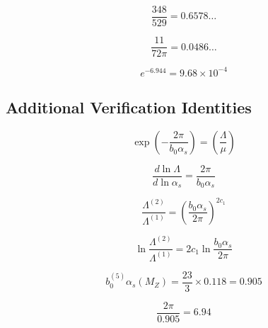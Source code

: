 \documentclass[11pt,a4paper]{article}
\theoremstyle{definition}
\begin{document}
\begin{equation}
\label{eq:cat-58}
\frac{348}{529} = 0.6578\ldots
\end{equation}

\begin{equation}
\label{eq:cat-59}
\frac{11}{72\pi} = 0.0486\ldots
\end{equation}

\begin{equation}
\label{eq:cat-60}
e^{-6.944} = 9.68 \times 10^{-4}
\end{equation}

\subsection{Additional Verification Identities}
\label{subsec:cat-add}

\begin{equation}
\label{eq:cat-61}
\exp\left(-\frac{2\pi}{b_0\alpha_s}\right) = \left(\frac{\Lambda}{\mu}\right)
\end{equation}

\begin{equation}
\label{eq:cat-62}
\frac{d\ln\Lambda}{d\ln\alpha_s} = \frac{2\pi}{b_0\alpha_s}
\end{equation}

\begin{equation}
\label{eq:cat-63}
\frac{\Lambda^{(2)}}{\Lambda^{(1)}} = \left(\frac{b_0\alpha_s}{2\pi}\right)^{2c_1}
\end{equation}

\begin{equation}
\label{eq:cat-64}
\ln\frac{\Lambda^{(2)}}{\Lambda^{(1)}} = 2c_1\ln\frac{b_0\alpha_s}{2\pi}
\end{equation}

\begin{equation}
\label{eq:cat-65}
b_0^{(5)}\alpha_s(M_Z) = \frac{23}{3} \times 0.118 = 0.905
\end{equation}

\begin{equation}
\label{eq:cat-66}
\frac{2\pi}{0.905} = 6.94
\end{equation}
\end{document}
